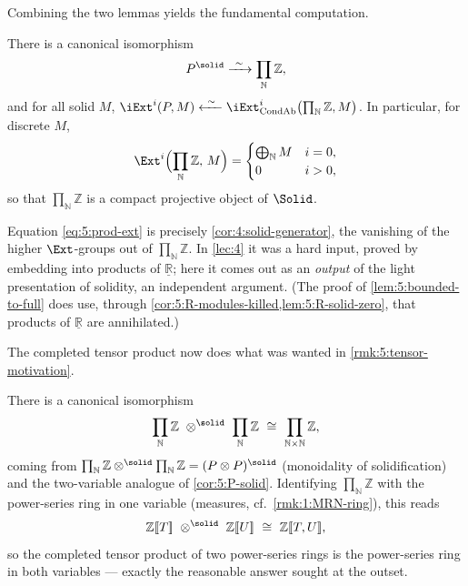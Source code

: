 Combining the two lemmas yields the fundamental computation.

\begin{corollary}
\label{cor:5:P-solid}
There is a canonical isomorphism
\begin{equation*}
P^{\solid}\xrightarrow{\ \sim\ }\prod_{\mathbb{N}}\mathbb{Z},
\end{equation*}
and for all solid $M$, $\iExt^{i}(P,M)\xleftarrow{\ \sim\ }\iExt^{i}_{\mathrm{CondAb}}
\bigl(\prod_{\mathbb{N}}\mathbb{Z},M\bigr)$. In particular, for discrete $M$,
\begin{equation}
\label{eq:5:prod-ext}
\Ext^{i}\Bigl(\prod_{\mathbb{N}}\mathbb{Z},\,M\Bigr)=
\begin{cases}
\bigoplus_{\mathbb{N}}M & i=0,\\
0 & i>0,
\end{cases}
\end{equation}
so that $\prod_{\mathbb{N}}\mathbb{Z}$ is a compact projective object of $\Solid$.
\end{corollary}

\begin{remark}
\label{rmk:5:independent-of-lec4}
Equation \eqref{eq:5:prod-ext} is precisely \cref{cor:4:solid-generator}, the
vanishing of the higher $\Ext$-groups out of $\prod_{\mathbb{N}}\mathbb{Z}$. In
\cref{lec:4} it was a hard input, proved by embedding into products of
$\underline{\mathbb{R}}$; here it comes out as an \emph{output} of the light
presentation of solidity, an independent argument. (The proof of
\cref{lem:5:bounded-to-full} does use, through
\cref{cor:5:R-modules-killed,lem:5:R-solid-zero}, that products of
$\underline{\mathbb{R}}$ are annihilated.)
\end{remark}

The completed tensor product now does what was wanted in
\cref{rmk:5:tensor-motivation}.

\begin{corollary}
\label{cor:5:tensor-square}
There is a canonical isomorphism
\begin{equation*}
\prod_{\mathbb{N}}\mathbb{Z}\ \otimes^{\solid}\ \prod_{\mathbb{N}}\mathbb{Z}
\ \cong\ \prod_{\mathbb{N}\times\mathbb{N}}\mathbb{Z},
\end{equation*}
coming from $\prod_{\mathbb{N}}\mathbb{Z}\otimes^{\solid}\prod_{\mathbb{N}}\mathbb{Z}
=(P\otimes P)^{\solid}$ (monoidality of solidification) and the two-variable
analogue of \cref{cor:5:P-solid}. Identifying
$\prod_{\mathbb{N}}\mathbb{Z}$ with the power-series ring in one variable (measures,
cf.\ \cref{rmk:1:MRN-ring}), this reads
\begin{equation*}
\mathbb{Z}[\![T]\!]\ \otimes^{\solid}\ \mathbb{Z}[\![U]\!]
\ \cong\ \mathbb{Z}[\![T,U]\!],
\end{equation*}
so the completed tensor product of two power-series rings is the power-series ring
in both variables --- exactly the reasonable answer sought at the outset.
\end{corollary}

